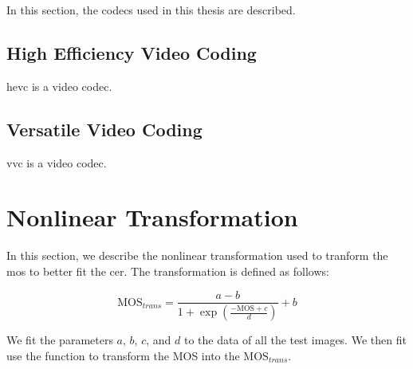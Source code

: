 In this section, the codecs used in this thesis are described.

\subsection{High Efficiency Video Coding}
\label{subsec:hevc}

\gls{hevc} is a video codec.

\subsection{Versatile Video Coding}
\label{subsec:vvc}

\gls{vvc} is a video codec.

\section{Nonlinear Transformation}
\label{sec:nonlinear}

In this section, we describe the nonlinear transformation used to tranform the \gls{mos} to better fit the \gls{cer}.
The transformation is defined as follows:

\begin{equation}
    \text{MOS}_{trans} = \frac{a - b}{1 + \exp \left( \frac{-\text{MOS} + c}{d} \right)} + b
    \label{eq:nonlinear}
\end{equation}
    
We fit the parameters \(a\), \(b\), \(c\), and \(d\) to the data of all the test images. We then fit use the function to transform the MOS into the $\text{MOS}_{trans}$.
